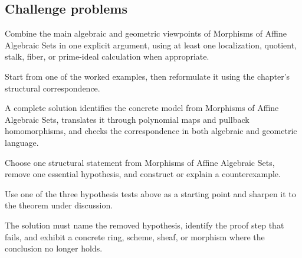 \subsection*{Challenge problems}

\begin{exercise}\label{exr:vi04-expand-15}
Combine the main algebraic and geometric viewpoints of Morphisms of Affine Algebraic Sets in one explicit argument, using at least one localization, quotient, stalk, fiber, or prime-ideal calculation when appropriate.
\end{exercise}
\begin{hint}
Start from one of the worked examples, then reformulate it using the chapter's structural correspondence.
\end{hint}
\begin{solution}
A complete solution identifies the concrete model from Morphisms of Affine Algebraic Sets, translates it through polynomial maps and pullback homomorphisms, and checks the correspondence in both algebraic and geometric language.
\end{solution}

\begin{exercise}\label{exr:vi04-expand-16}
Choose one structural statement from Morphisms of Affine Algebraic Sets, remove one essential hypothesis, and construct or explain a counterexample.
\end{exercise}
\begin{hint}
Use one of the three hypothesis tests above as a starting point and sharpen it to the theorem under discussion.
\end{hint}
\begin{solution}
The solution must name the removed hypothesis, identify the proof step that fails, and exhibit a concrete ring, scheme, sheaf, or morphism where the conclusion no longer holds.
\end{solution}

